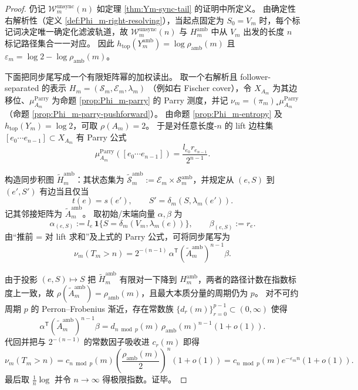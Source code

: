 \begin{proof}
仍记 \(\mathcal{W}_{m}^{\mathrm{unsync}}(n)\) 如定理 \ref{thm:Ym-sync-tail} 的证明中所定义。
由确定性右解析性（定义 \ref{def:Phi_m-right-resolving}），当起点固定为 \(S_0=V_m\) 时，每个标记词决定唯一确定化滤波轨道，故 \(\mathcal{W}_{m}^{\mathrm{unsync}}(n)\) 与 \(H_m^{\mathrm{amb}}\) 中从 \(V_m\) 出发的长度 \(n\) 标记路径集合一一对应。
因此 \(h_{\mathrm{top}}(Y_m^{\mathrm{amb}})=\log\rho_{\mathrm{amb}}(m)\) 且 \(\varepsilon_m=\log 2-\log\rho_{\mathrm{amb}}(m)\)。
\par
下面把同步尾写成一个有限矩阵幂的加权读出。
取一个右解析且 follower-separated 的表示
\(
H_m=(\mathcal{S}_m,\mathcal{E}_m,\lambda_m)
\)
（例如右 Fischer cover），令 \(X_{A_m}\) 为其边移位、\(\mu_{A_m}^{\mathrm{Parry}}\) 为命题 \ref{prop:Phi_m-parry} 的 Parry 测度，并记 \(\nu_m=(\pi_m)_*\mu_{A_m}^{\mathrm{Parry}}\)（命题 \ref{prop:Phi_m-parry-pushforward}）。
由命题 \ref{prop:Phi_m-entropy} 及 \(h_{\mathrm{top}}(Y_m)=\log 2\)，可取 \(\rho(A_m)=2\)。
于是对任意长度-\(n\) 的 lift 边柱集 \([e_0\cdots e_{n-1}]\subset X_{A_m}\) 有 Parry 公式
\[
\mu_{A_m}^{\mathrm{Parry}}([e_0\cdots e_{n-1}])=\frac{l_{e_0}r_{e_{n-1}}}{2^{n-1}}.
\]
\par
构造同步积图 \(\widetilde H_m^{\mathrm{amb}}\)：其状态集为
\(
\widetilde{\mathcal{S}}_m^{\mathrm{amb}}:=\mathcal{E}_m\times\mathcal{S}_m^{\mathrm{amb}}
\)，并规定从 \((e,S)\) 到 \((e',S')\) 有边当且仅当
\[
t(e)=s(e'),\qquad S'=\delta_m(S,\lambda_m(e')).
\]
记其邻接矩阵为 \(\widetilde A_m^{\mathrm{amb}}\)。
取初始/末端向量 \(\alpha,\beta\) 为
\[
\alpha_{(e,S)}:=l_e\,\mathbf{1}\{S=\delta_m(V_m,\lambda_m(e))\},
\qquad
\beta_{(e,S)}:=r_e.
\]
由“推前 = 对 lift 求和”及上式的 Parry 公式，可将同步尾写为
\[
\nu_m(T_m>n)=2^{-(n-1)}\,\alpha^{\mathsf T}(\widetilde A_m^{\mathrm{amb}})^{n-1}\beta.
\]
\par
由于投影 \((e,S)\mapsto S\) 把 \(\widetilde H_m^{\mathrm{amb}}\) 有限对一下降到 \(H_m^{\mathrm{amb}}\)，两者的路径计数在指数标度上一致，故 \(\rho(\widetilde A_m^{\mathrm{amb}})=\rho_{\mathrm{amb}}(m)\)，且最大本质分量的周期仍为 \(p\)。
对不可约周期 \(p\) 的 Perron--Frobenius 渐近，存在常数族 \(\{d_r(m)\}_{r=0}^{p-1}\subset(0,\infty)\) 使得
\[
\alpha^{\mathsf T}(\widetilde A_m^{\mathrm{amb}})^{n-1}\beta
=d_{n\bmod p}(m)\,\rho_{\mathrm{amb}}(m)^{n-1}(1+o(1)).
\]
代回并把与 \(2^{-(n-1)}\) 的常数因子吸收进 \(c_r(m)\) 即得
\[
\nu_m(T_m>n)
=c_{n\bmod p}(m)\left(\frac{\rho_{\mathrm{amb}}(m)}{2}\right)^{\!n}(1+o(1))
=c_{n\bmod p}(m)e^{-\varepsilon_m n}(1+o(1)).
\]
最后取 \(\frac1n\log\) 并令 \(n\to\infty\) 得极限指数。证毕。
\end{proof}

